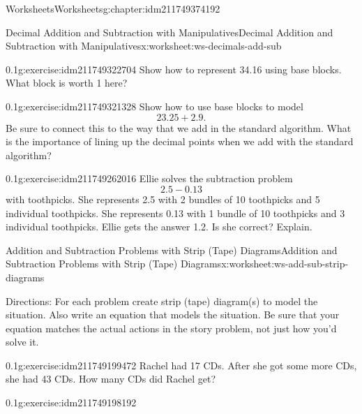 \documentclass[twoside,11pt,]{book}
\begin{document}
\begin{chapterptx}{Worksheets}{}{Worksheets}{}{}{g:chapter:idm211749374192}
\begin{worksheet-section-numberless}{Decimal Addition and Subtraction with Manipulatives}{}{Decimal Addition and Subtraction with Manipulatives}{}{}{x:worksheet:ws-decimals-add-sub}
\begin{divisionexercise}{2}{}{0.1}{g:exercise:idm211749322704}%
Show how to represent 34.16 using base blocks.  What block is worth 1 here?%
\end{divisionexercise}%
\begin{divisionexercise}{3}{}{0.1}{g:exercise:idm211749321328}%
Show how to use base blocks to model%
\begin{equation*}
23.25+2.9\text{.}
\end{equation*}
Be sure to connect this to the way that we add in the standard algorithm.  What is the importance of lining up the decimal points when we add with the standard algorithm?%
\end{divisionexercise}%
\begin{divisionexercise}{4}{}{0.1}{g:exercise:idm211749262016}%
Ellie solves the subtraction problem%
\begin{equation*}
2.5-0.13
\end{equation*}
with toothpicks.  She represents 2.5 with 2 bundles of 10 toothpicks and 5 individual toothpicks.  She represents 0.13 with 1 bundle of 10 toothpicks and 3 individual toothpicks.  Ellie gets the answer 1.2.  Is she correct?  Explain.%
\end{divisionexercise}%
\end{worksheet-section-numberless}
\restoregeometry
%
%
\typeout{************************************************}
\typeout{************************************************}
%
\begin{worksheet-section-numberless}{Addition and Subtraction Problems with Strip (Tape) Diagrams}{}{Addition and Subtraction Problems with Strip (Tape) Diagrams}{}{}{x:worksheet:ws-add-sub-strip-diagrams}
\begin{introduction}{}%
Directions: For each problem create strip (tape) diagram(s) to model the situation.  Also write an equation that models the situation.  Be sure that your equation matches the actual actions in the story problem, not just how you’d solve it.%
\end{introduction}%
\begin{divisionexercise}{1}{}{0.1}{g:exercise:idm211749199472}%
Rachel had 17 CDs.  After she got some more CDs, she had 43 CDs.  How many CDs did Rachel get?%
\end{divisionexercise}%
\begin{divisionexercise}{2}{}{0.1}{g:exercise:idm211749198192}%

\end{divisionexercise}
\end{worksheet-section-numberless}
\end{chapterptx}
\end{document}
